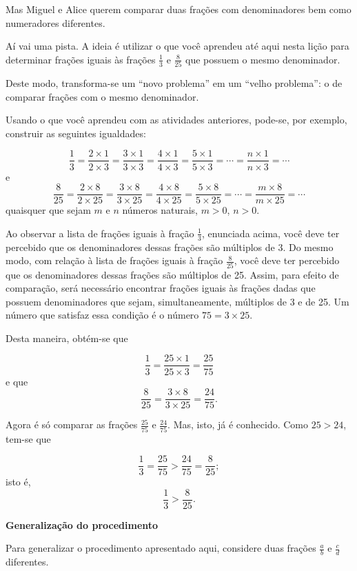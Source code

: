 \documentclass[a4,12pt]{book}
\begin{document}
Mas Miguel e Alice querem comparar duas frações com denominadores bem como numeradores diferentes.

Aí vai uma pista.  A ideia é utilizar o que você aprendeu até aqui nesta lição para determinar frações iguais às frações $\frac{1}{3}$ e $\frac{8}{25}$ que possuem o mesmo denominador. 

Deste modo, transforma-se um ``novo problema'' em um ``velho problema'': o de comparar frações com o mesmo denominador.

Usando o que você aprendeu com as atividades anteriores, pode-se, por exemplo, construir as seguintes igualdades:  

$$\dfrac{1}{3} = \dfrac{2 \times 1}{2 \times 3} = \dfrac{3 \times 1}{3 \times 3} = \dfrac{4 \times 1}{4 \times 3} = \dfrac{5 \times 1}{5 \times 3} = \cdots = \dfrac{n \times 1}{n\times 3} = \cdots$$
e
$$\dfrac{8}{25} = \dfrac{2 \times 8}{2 \times 25} = \dfrac{3 \times 8}{3 \times 25} = \dfrac{4 \times 8}{4 \times 25} = \dfrac{5 \times 8}{5 \times 25} = \cdots = \dfrac{m \times 8}{m\times 25} = \cdots$$
quaisquer que sejam $m$ e $n$ números naturais, $m > 0$, $n > 0$.

Ao observar a lista de frações iguais à fração $\frac{1}{3}$, enunciada acima, você deve ter percebido que os denominadores dessas frações são múltiplos de 3.  Do mesmo modo, com relação à lista de frações iguais à fração $\frac{8}{25}$, você deve ter percebido que os denominadores dessas frações são múltiplos de 25. Assim, para efeito de comparação, será necessário encontrar frações iguais às frações dadas que possuem denominadores que sejam, simultaneamente, múltiplos de 3 e de 25. Um número que satisfaz essa condição é o número $75 = 3 \times 25$.

Desta maneira, obtém-se que

$$\dfrac{1}{3} = \dfrac{25 \times 1}{25 \times 3} = \dfrac{25}{75}$$
e que 
$$\dfrac{8}{25} = \dfrac{3 \times 8}{3 \times 25} = \dfrac{24}{75}.$$ 

Agora é só comparar as frações $\frac{25}{75}$ e $\frac{24}{75}$. Mas, isto, já é conhecido.
Como $25 > 24$, tem-se que 

$$\dfrac{1}{3} = \dfrac{25}{75} > \dfrac{24}{75} =  \dfrac{8}{25};$$
isto é, 
$$\dfrac{1}{3} > \dfrac{8}{25}.$$

{\bf Generalização do procedimento}

Para generalizar o procedimento apresentado aqui, considere duas frações $\frac{a}{b}$ e $\frac{c}{d}$ diferentes.
\end{document}
